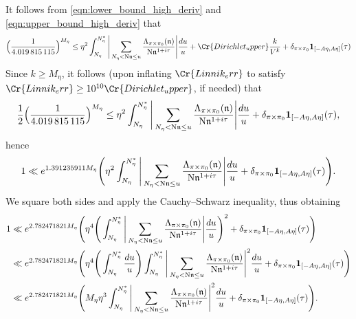 \documentclass[11pt]{amsart}
\theoremstyle{remark}
\numberwithin{equation}{section}
\newcommand{\kn}{\mathfrak{n}}
\newcommand{\N}{\textnormal{N}}
\begin{document}
It follows from \eqref{eqn:lower_bound_high_deriv} and \eqref{eqn:upper_bound_high_deriv} that
\[
\Big(\frac{1}{4.019\,815\,115}\Big)^{M_{\eta}}\leq \eta^2\int_{N_{\eta}}^{N_{\eta}^*}\Bigg|\sum_{N_{\eta}<\N\kn\leq u}\frac{\Lambda_{\pi\times\pi_0}(\kn)}{\N\kn^{1+i\tau}}\Bigg|\frac{du}{u}+\Cr{Dirichlet_upper}\frac{k}{V^k}+\delta_{\pi\times\pi_0}\mathbf{1}_{[-A\eta,A\eta]}(\tau)
\]
Since $k\geq M_{\eta}$, it follows (upon inflating $\Cr{Linnik_err}$ to satisfy $\Cr{Linnik_err}\geq 10^{10}\Cr{Dirichlet_upper}$, if needed) that
\[
\frac{1}{2}\Big(\frac{1}{4.019\,815\,115}\Big)^{M_{\eta}}\leq \eta^2\int_{N_{\eta}}^{N_{\eta}^*}\Bigg|\sum_{N_{\eta}<\N\kn\leq u}\frac{\Lambda_{\pi\times\pi_0}(\kn)}{\N\kn^{1+i\tau}}\Bigg|\frac{du}{u}+\delta_{\pi\times\pi_0}\mathbf{1}_{[-A\eta,A\eta]}(\tau),
\]
hence
\[
1\ll e^{1.391235911 M_{\eta}}\Bigg(\eta^2\int_{N_{\eta}}^{N_{\eta}^*}\Bigg|\sum_{N_{\eta}<\N\kn\leq u}\frac{\Lambda_{\pi\times\pi_0}(\kn)}{\N\kn^{1+i\tau}}\Bigg|\frac{du}{u}+\delta_{\pi\times\pi_0}\mathbf{1}_{[-A\eta,A\eta]}(\tau)\Bigg).
\]
We square both sides and apply the Cauchy--Schwarz inequality, thus obtaining
\begin{align*}
1&\ll e^{2.782471821 M_{\eta}}\Bigg(\eta^4\Bigg(\int_{N_{\eta}}^{N_{\eta}^*}\Bigg|\sum_{N_{\eta}<\N\kn\leq u}\frac{\Lambda_{\pi\times\pi_0}(\kn)}{\N\kn^{1+i\tau}}\Bigg|\frac{du}{u}\Bigg)^2+\delta_{\pi\times\pi_0}\mathbf{1}_{[-A\eta,A\eta]}(\tau)\Bigg)\\
&\ll e^{2.782471821 M_{\eta}}\Bigg(\eta^4\Bigg(\int_{N_{\eta}}^{N_{\eta}^*}\frac{du}{u}\Bigg)\int_{N_{\eta}}^{N_{\eta}^*}\Bigg|\sum_{N_{\eta}<\N\kn\leq u}\frac{\Lambda_{\pi\times\pi_0}(\kn)}{\N\kn^{1+i\tau}}\Bigg|^2\frac{du}{u}+\delta_{\pi\times\pi_0}\mathbf{1}_{[-A\eta,A\eta]}(\tau)\Bigg)\\
&\ll e^{2.782471821 M_{\eta}}\Bigg(M_{\eta}\eta^3\int_{N_{\eta}}^{N_{\eta}^*}\Bigg|\sum_{N_{\eta}<\N\kn\leq u}\frac{\Lambda_{\pi\times\pi_0}(\kn)}{\N\kn^{1+i\tau}}\Bigg|^2\frac{du}{u}+\delta_{\pi\times\pi_0}\mathbf{1}_{[-A\eta,A\eta]}(\tau)\Bigg).
\end{align*}




\end{document}
